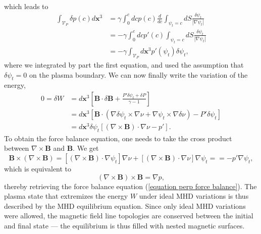 \documentclass[my_thesis.tex]{subfiles}
\begin{document}
which leads to
\begin{align}
	\int_{\mathcal{V}_P}\delta p(c)d\mathbf{x}^3 &= \gamma\int_0^c dc p(c) \frac{d}{dc}\int_{\psi_t=c}dS\frac{\delta\psi_t}{|\nabla\psi_t|}\\
	&= -\gamma\int_0^c dc p'(c) \int_{\psi_t=c}dS\frac{\delta\psi_t}{|\nabla\psi_t|}\\
	&= -\gamma\int_{\mathcal{V}_P} d\mathbf{x}^3 p'(\psi_t)\delta\psi_t,
\end{align}
where we integrated by part the first equation, and used the assumption that $\delta\psi_t=0$ on the plasma boundary. We can now finally write the variation of the energy,
\begin{align}
	0 = \delta W &= d\mathbf{x}^3 \left[\mathbf{B}\cdot\delta\mathbf{B} + \frac{P'\delta\psi_t + \delta P}{\gamma-1}\right]\\
	&= d\mathbf{x}^3 \left[\mathbf{B}\cdot (\nabla\delta\psi_t\times\nabla\nu + \nabla\psi_t\times\nabla\delta\nu) -P'\delta\psi_t\right]\\
	&= d\mathbf{x}^3 \delta\psi_t\left[(\nabla\times\mathbf{B})\cdot\nabla\nu -p'\right].
\end{align}
To obtain the force balance equation, one needs to take the cross product between $\nabla\times\mathbf{B}$ and $\mathbf{B}$. We get
\begin{equation}
	\mathbf{B}\times(\nabla\times\mathbf{B}) = [(\nabla\times\mathbf{B})\cdot\nabla\psi_t]\nabla\nu + [(\nabla\times\mathbf{B})\cdot\nabla\nu]\nabla\psi_t = = -p'\nabla\psi_t,
\end{equation}
which is equivalent to
\begin{equation}
	(\nabla\times\mathbf{B})\times\mathbf{B} = \nabla p,
\end{equation}
thereby retrieving the force balance equation (\ref{equation perp force balance}). The plasma state that extremizes the energy $W$ under ideal MHD variations is thus described by the MHD equilibrium equation. Since only ideal MHD variations were allowed, the magnetic field line topologies are conserved between the initial and final state --- the equilibrium is thus filled with nested magnetic surfaces.
\end{document}
